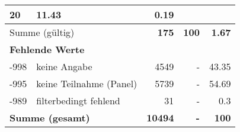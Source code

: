 \begin{longtable}{lXrrr}
       \num{20} &
       \num[round-mode=places,round-precision=2]{11.43} &
         \num[round-mode=places,round-precision=2]{0.19} \\
     \midrule
     \multicolumn{2}{l}{Summe (gültig)} &
       \textbf{\num{175}} &
     \textbf{\num{100}} &
       \textbf{\num[round-mode=places,round-precision=2]{1.67}} \\
     \multicolumn{5}{l}{\textbf{Fehlende Werte}}\\
       -998 &
       keine Angabe &
         \num{4549} &
        - &
         \num[round-mode=places,round-precision=2]{43.35} \\
       -995 &
       keine Teilnahme (Panel) &
         \num{5739} &
        - &
         \num[round-mode=places,round-precision=2]{54.69} \\
       -989 &
       filterbedingt fehlend &
         \num{31} &
        - &
         \num[round-mode=places,round-precision=2]{0.3} \\
     \midrule
     \multicolumn{2}{l}{\textbf{Summe (gesamt)}} &
          \textbf{\num{10494}} &
        \textbf{-} &
        \textbf{\num{100}} \\
     \bottomrule
     \end{longtable}
     
